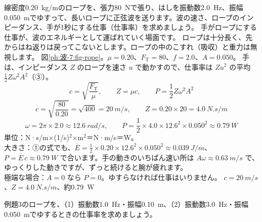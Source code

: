 \label{ph:波-7:ex3}
\begin{phreidai}[ロープをゆする手の仕事率]
線密度\qty{0.20}{kg/m}のロープを、張力\qty{80}{N}で張り、はしを振動数\qty{2.0}{Hz}、振幅\qty{0.050}{m}でゆすって、長いロープに正弦波を送ります。波の速さ、ロープのインピーダンス、手が1秒にする仕事（仕事率）を求めましょう。
\phbamen
手がロープにする仕事が、波のエネルギーとして運ばれていく場面です。
\phmushi
ロープは十分長く、先からはね返りは戻ってこないとします。ロープの中のこすれ（吸収）と重力は無視します。
\phzu
図\ref{ph:波-7:fig-rope}。$\mu=0.20$、$F_{\mathrm T}=80$、$f=2.0$、$A=0.050$。
\phriyu
手は、インピーダンス $Z$ のロープを速さ $u$ で動かすので、仕事率は $Zu^2$ の平均 $\tfrac12Z\omega^2A^2$（③）。
\phtateru
\[c=\sqrt{\frac{F_{\mathrm T}}{\mu}},\qquad Z=\mu c,\qquad P=\frac12Z\omega^2A^2\]
\phtoku
\[c=\sqrt{\frac{80}{0.20}}=\sqrt{400}=\qty{20}{m/s},\qquad Z=0.20\times20=\qty{4.0}{N.s/m}\]
\[\omega=2\pi\times2.0\approx\qty{12.6}{rad/s},\qquad P=\frac12\times4.0\times12.6^2\times0.050^2\approx\qty{0.79}{W}\]
\phtashikame
単位：N·s/m×(1/s)$^2$×m$^2$＝N·m/s＝W。\\
大きさ：①の式でも、$\overline E=\tfrac12\times0.20\times12.6^2\times0.050^2\approx\qty{0.039}{J/m}$、$P=\overline E\,c\approx\qty{0.79}{W}$ で合います。手の動きのいちばん速い所は $A\omega\approx\qty{0.63}{m/s}$ で、ゆっくりした動きですが、ずっと続けると腕が疲れます。\\
極端な場合：$A=0$ なら $P=0$。ゆすらなければ仕事はいりません。
\kotae $c=\qty{20}{m/s}$、$Z=\qty{4.0}{N.s/m}$、約\qty{0.79}{W}
\end{phreidai}
\begin{jibun}
例題3のロープを、（1）振動数\qty{1.0}{Hz}・振幅\qty{0.10}{m}、（2）振動数\qty{3.0}{Hz}・振幅\qty{0.050}{m}でゆするときの仕事率を求めましょう。
\end{jibun}

